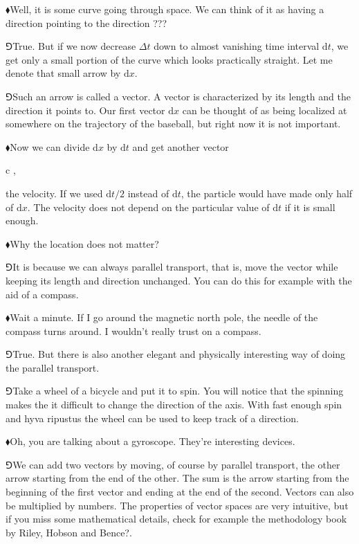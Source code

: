\documentclass[10pt,oneside%
]{memoir}
\newenvironment{eqna}{\begin{IEEEeqnarray*}{c}}{\end{IEEEeqnarray*}\ignorespacesafterend}
\newcommand{\der}[2]{\frac{\dd#1}{\dd#2}}
\newcommand{\dd}{\mathrm{d}}
\newcommand{\hea}{\(\blacklozenge\)\;}
\newcommand{\heb}{\(\Game\)\;}
\begin{document}
\hea Well, it is some curve going through space. We can think of it as having a direction pointing to the direction ???

\heb True. But if we now decrease \(\Delta t\) down to almost vanishing time interval \(\dd t\), we get only a small portion of the curve which looks practically straight. Let me denote that small arrow by \(\dd x\).

\heb Such an arrow is called a vector. A vector is characterized by its length and the direction it points to. Our first vector \(\dd x\) can be thought of as being localized at somewhere on the trajectory of the baseball, but right now it is not important.

\hea Now we can divide \(\dd x\) by \(\dd t\) and get another vector
\begin{eqna}
    \der{x}{t}\doteq{},
\end{eqna}
the velocity. If we used \(\dd t/2\) instead of \(\dd t\), the particle would have made only half of \(\dd x\). The velocity does not depend on the particular value of \(\dd t\) if it is small enough.

\hea Why the location does not matter?

\heb It is because we can always parallel transport, that is, move the vector while keeping its length and direction unchanged. You can do this for example with the aid of a compass.

\hea Wait a minute. If I go around the magnetic north pole, the needle of the compass turns around. I wouldn't really trust on a compass.

\heb True. But there is also another elegant and physically interesting way of doing the parallel transport.

\heb Take a wheel of a bicycle and put it to spin. You will notice that the spinning makes the it difficult to change the direction of the axis. With fast enough spin and hyva ripustus the wheel can be used to keep track of a direction.

\hea Oh, you are talking about a gyroscope. They're interesting devices.

\heb We can add two vectors by moving, of course by parallel transport, the other arrow starting from the end of the other. The sum is the arrow starting from the beginning of the first vector and ending at the end of the second. Vectors can also be multiplied by numbers. The properties of vector spaces are very intuitive, but if you miss some mathematical details, check for example the methodology book by Riley, Hobson and Bence?.
\end{document}
